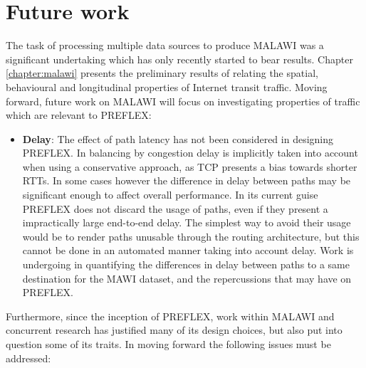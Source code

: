 \section{Future work}


The task of processing multiple data sources to produce \ac{MALAWI} was a significant undertaking which has only recently started to bear results.
Chapter \ref{chapter:malawi} presents the preliminary results of relating the spatial, behavioural and longitudinal properties of Internet transit traffic.
Moving forward, future work on \ac{MALAWI} will focus on investigating properties of traffic which are relevant to \ac{PREFLEX}:

\begin{itemize}
\item{
    \textbf{Delay}: The effect of path latency has not been considered in designing \ac{PREFLEX}.
    In balancing by congestion delay is implicitly taken into account when using a conservative approach, as \ac{TCP} presents a bias towards shorter \acp{RTT}.
    In some cases however the difference in delay between paths may be significant enough to affect overall performance.
    In its current guise \ac{PREFLEX} does not discard the usage of paths, even if they present a impractically large end-to-end delay.
    The simplest way to avoid their usage would be to render paths unusable through the routing architecture, but this cannot be done in an automated manner taking into account delay.
    Work is undergoing in quantifying the differences in delay between paths to a same destination for the \ac{MAWI} dataset, and the repercussions that may have on \ac{PREFLEX}.
}
\end{itemize}

Furthermore, since the inception of \ac{PREFLEX}, work within \ac{MALAWI} and concurrent research has justified many of its design choices, but also put into question some of its traits.
In moving forward the following issues must be addressed:

